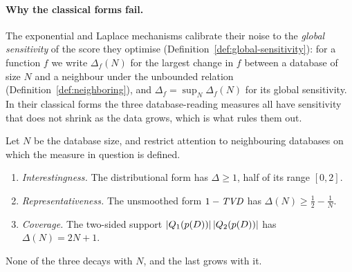 
\paragraph{Why the classical forms fail.}
The exponential and Laplace mechanisms calibrate their noise to the \emph{global sensitivity} of the score they optimise (Definition~\ref{def:global-sensitivity}): for a function $f$ we write $\Delta_f(N)$ for the largest change in $f$ between a database of size $N$ and a neighbour under the unbounded relation (Definition~\ref{def:neighboring}), and $\Delta_f=\sup_N\Delta_f(N)$ for its global sensitivity.
In their classical forms the three database-reading measures all have sensitivity that does not shrink as the data grows, which is what rules them out.

\begin{proposition}
\label{prop:sensitivity-itemized}
Let $N$ be the database size, and restrict attention to neighbouring databases on which the measure in question is defined.
\begin{enumerate}[label=(\roman*),leftmargin=*]
\item \emph{Interestingness.} The distributional form has $\Delta\ge1$, half of its range $[0,2]$.
\item \emph{Representativeness.} The unsmoothed form $1-\mathit{TVD}$ has $\Delta(N)\ge\frac12-\frac1N$.
\item \emph{Coverage.} The two-sided support $|Q_1(p(D))|\,|Q_2(p(D))|$ has $\Delta(N)=2N+1$.
\end{enumerate}
None of the three decays with $N$, and the last grows with it.
\end{proposition}

